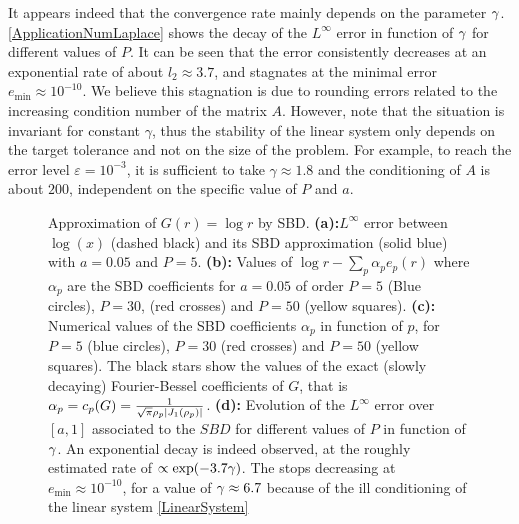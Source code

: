 \documentclass[smallextended]{svjour3}
\begin{document}
\begin{remark}
	It appears indeed that the convergence rate mainly depends on the parameter $\gamma$. \autoref{ApplicationNumLaplace} shows the decay of the $L^\infty$ error in function of $\gamma$ for different values of $P$. It can be seen that the error consistently decreases at an exponential rate of about $l_2 \approx 3.7$, and stagnates at the minimal error $e_{\min} \approx 10^{-10}$. We believe this stagnation is due to rounding errors related to the increasing condition number of the matrix $A$. However, note that the situation is invariant for constant $\gamma$, thus the stability of the linear system only depends on the target tolerance and not on the size of the problem. For example, to reach the error level $\varepsilon = 10^{-3}$, it is sufficient to take $\gamma \approx 1.8$ and the conditioning of $A$ is about $200$, independent on the specific value of $P$ and $a$.  
\end{remark}
\begin{figure}[h]
	\newlength{\plotwidth}
	\setlength{\plotwidth}{0.4\textwidth}
	\centering		
	\begin{subfigure}[b]{\plotwidth}
		\centering
		
		\caption{}
	\end{subfigure}%
	\begin{subfigure}[b]{\plotwidth}
		\centering
		
		\caption{}
	\end{subfigure}%
																																																																								
	\begin{subfigure}[b]{\plotwidth}
		\centering
		
		\caption{}	
	\end{subfigure}%
	\begin{subfigure}[b]{\plotwidth}
		\centering
		
		\caption{}				
		\label{ApplicationNumLaplace}
	\end{subfigure}%
	\caption{Approximation of $G(r) = \log r$ by SBD. \textbf{(a):}$L^{\infty}$ error between $\log(x)$ (dashed black) and its SBD approximation (solid blue) with $a=0.05$ and $P=5$. \textbf{(b):} Values of $\log r - \sum_{p}\alpha_pe_p(r)$ where $\alpha_p$ are the SBD coefficients for $a=0.05$ of order $P=5$ (Blue circles), $P=30$, (red crosses) and $P=50$ (yellow squares). \textbf{(c):} Numerical values of the SBD coefficients $\alpha_p$ in function of $p$, for $P=5$ (blue circles), $P=30$ (red crosses) and $P=  50$ (yellow squares). The black stars show the values of the exact (slowly decaying) Fourier-Bessel coefficients of $G$, that is $\alpha_p = c_p(G) = \frac{1}{\sqrt{\pi}\rho_p \left\lvert J_1(\rho_p) \right\rvert}$. \textbf{(d):} Evolution of the $L^{\infty}$ error over $[a,1]$ associated to the $SBD$ for different values of $P$ in function of $\gamma$. An exponential decay is indeed observed, at the roughly estimated rate of $\propto \exp(-3.7\gamma)$. The stops decreasing at $e_{\min} \approx 10^{-10}$, for a value of $\gamma \approx 6.7$ because of the ill conditioning of the linear system \eqref{LinearSystem}}
	\label{MultiFig}
\end{figure}
\end{document}
